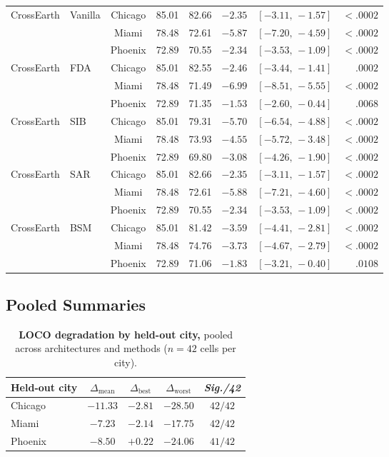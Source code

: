 \begin{table}[h]
\begin{tabular}{@{}llcrrrcr@{}}
\cmidrule(l){1-8}
CrossEarth & Vanilla & Chicago & 85.01 & 82.66 & $-2.35$ & $[-3.11,\,-1.57]$ & $<\!.0002$ \\
 &  & Miami & 78.48 & 72.61 & $-5.87$ & $[-7.20,\,-4.59]$ & $<\!.0002$ \\
 &  & Phoenix & 72.89 & 70.55 & $-2.34$ & $[-3.53,\,-1.09]$ & $<\!.0002$ \\
\cmidrule(l){1-8}
CrossEarth & FDA & Chicago & 85.01 & 82.55 & $-2.46$ & $[-3.44,\,-1.41]$ & $.0002$ \\
 &  & Miami & 78.48 & 71.49 & $-6.99$ & $[-8.51,\,-5.55]$ & $<\!.0002$ \\
 &  & Phoenix & 72.89 & 71.35 & $-1.53$ & $[-2.60,\,-0.44]$ & $.0068$ \\
\cmidrule(l){1-8}
CrossEarth & SIB & Chicago & 85.01 & 79.31 & $-5.70$ & $[-6.54,\,-4.88]$ & $<\!.0002$ \\
 &  & Miami & 78.48 & 73.93 & $-4.55$ & $[-5.72,\,-3.48]$ & $<\!.0002$ \\
 &  & Phoenix & 72.89 & 69.80 & $-3.08$ & $[-4.26,\,-1.90]$ & $<\!.0002$ \\
\cmidrule(l){1-8}
CrossEarth & SAR & Chicago & 85.01 & 82.66 & $-2.35$ & $[-3.11,\,-1.57]$ & $<\!.0002$ \\
 &  & Miami & 78.48 & 72.61 & $-5.88$ & $[-7.21,\,-4.60]$ & $<\!.0002$ \\
 &  & Phoenix & 72.89 & 70.55 & $-2.34$ & $[-3.53,\,-1.09]$ & $<\!.0002$ \\
\cmidrule(l){1-8}
CrossEarth & BSM & Chicago & 85.01 & 81.42 & $-3.59$ & $[-4.41,\,-2.81]$ & $<\!.0002$ \\
 &  & Miami & 78.48 & 74.76 & $-3.73$ & $[-4.67,\,-2.79]$ & $<\!.0002$ \\
 &  & Phoenix & 72.89 & 71.06 & $-1.83$ & $[-3.21,\,-0.40]$ & $.0108$ \\
\bottomrule
\end{tabular}
\end{table}

\subsection{Pooled Summaries}

\begin{table}[h]
\centering
\small
\caption{
\textbf{LOCO degradation by held-out city,} pooled across architectures and
methods ($n = 42$ cells per city).
}
\label{tab:loco-per-city}
\begin{tabular}{lcccc}
\toprule
\textbf{Held-out city} & $\Delta_{\text{mean}}$ & $\Delta_{\text{best}}$ & $\Delta_{\text{worst}}$ & \textit{Sig./42} \\
\midrule
Chicago & $-11.33$ & $-2.81$  & $-28.50$ & $42/42$ \\
Miami   & $-7.23$ & $-2.14$  & $-17.75$ & $42/42$ \\
Phoenix & $-8.50$ & $+0.22$  & $-24.06$ & $41/42$ \\
\bottomrule
\end{tabular}
\end{table}

